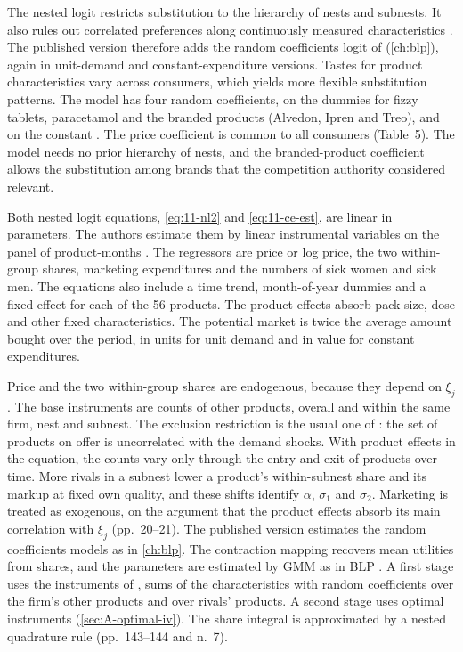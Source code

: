  The nested logit restricts substitution to the hierarchy of nests and subnests. It
also rules out correlated preferences along continuously measured characteristics
\citep[p.~137]{BjornerstedtVerboven2016}. The published version therefore adds the random coefficients logit of
\citet{BerryLevinsohnPakes1995} (\cref{ch:blp}), again in unit-demand and constant-expenditure versions. Tastes for
product characteristics vary across consumers, which yields more flexible substitution patterns. The model has four
random coefficients, on the dummies for fizzy tablets, paracetamol and the branded products (Alvedon, Ipren and
Treo), and on the constant \citep[p.~143]{BjornerstedtVerboven2016}. The price coefficient is common to all
consumers (Table~5). The model needs no prior hierarchy of nests, and the branded-product coefficient allows the
substitution among brands that the competition authority considered relevant.

 Both nested logit equations, \eqref{eq:11-nl2} and \eqref{eq:11-ce-est},
are linear in parameters. The authors estimate them by linear instrumental variables on the panel of product-months
\citep[Section 4.1]{BjornerstedtVerboven2013}. The regressors are price or log price, the two within-group shares,
marketing expenditures and the numbers of sick women and sick men. The equations also include a time trend,
month-of-year dummies and a fixed effect for each of the 56 products. The product effects absorb pack size, dose and other fixed characteristics. The
potential market is twice the average amount bought over the period, in units for unit demand and in value for
constant expenditures.

Price and the two within-group shares are endogenous, because they depend on $\xi_j$. The base instruments are
counts of other products, overall and within the same firm, nest and subnest. The exclusion restriction is the usual
one of \citet{BerryLevinsohnPakes1995}: the set of products on offer is uncorrelated with the demand shocks. With
product effects in the equation, the counts vary only through the entry and exit of products over time. More rivals
in a subnest lower a product's within-subnest share and its markup at fixed own quality, and these shifts identify
$\alpha$, $\sigma_1$ and $\sigma_2$. Marketing is treated as exogenous, on the argument that the product effects
absorb its main correlation with $\xi_j$ (pp.~20--21). The published version estimates the random coefficients
models as in \cref{ch:blp}. The contraction mapping recovers mean utilities from shares, and the parameters are
estimated by GMM as in BLP \citep[p.~158]{BjornerstedtVerboven2016}. A first stage uses the instruments of
\citet{BerryLevinsohnPakes1995}, sums of the characteristics with random coefficients over the firm's other products
and over rivals' products. A second stage uses optimal instruments (\cref{sec:A-optimal-iv}). The share integral is
approximated by a nested quadrature rule (pp.~143--144 and n.~7).

